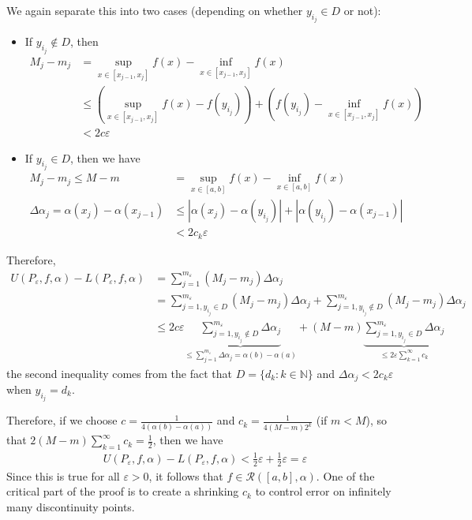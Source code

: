 \documentclass{tufte-handout}
\begin{document}
We again separate this into two cases (depending on whether \( y_{i_j} \in D \) or not):
\begin{itemize}
    \item If \( y_{i_j} \not\in D\), then 
    \begin{align}
    M_j - m_j &= \sup_{x \in [x_{j-1}, x_j]}f(x) - \inf_{x \in [x_{j-1}, x_j]}f(x)\\
    &\leq \left(
    \sup_{x \in [x_{j-1}, x_j]}f(x) - f(y_{i_j})\right) + \left(f(y_{i_j}) - \inf_{x \in [x_{j-1}, x_j]}f(x)\right)\\
    &< 2c\varepsilon
    \end{align}
    \item If \( y_{i_j} \in D \), then we have
    \begin{align}
    M_j - m_j \leq M-m &= \sup_{x \in [a,b]}f(x) - \inf_{x \in [a,b]}f(x) 
    \\
    \Delta \alpha_j = \alpha(x_j) - \alpha(x_{j-1}) &\leq |\alpha(x_j) - \alpha(y_{i_j})| + |\alpha(y_{i_j}) - \alpha(x_{j-1})|\\
     &< 2c_k\varepsilon
    \end{align}
\end{itemize}
Therefore, \begin{align}
    U(P_\varepsilon, f, \alpha) - L(P_\varepsilon, f, \alpha)
    &= \sum_{j=1}^{m_\varepsilon}(M_j - m_j)\Delta \alpha_j\\
    &= \sum_{j=1, y_{i_j} \in D}^{m_\varepsilon}(M_j - m_j)\Delta \alpha_j + \sum_{j=1, y_{i_j} \not\in D}^{m_\varepsilon}(M_j - m_j)\Delta \alpha_j\\
    &\leq 2c\varepsilon \underbrace{\sum_{j=1, y_{i_j} \not\in D}^{m_\varepsilon}\Delta \alpha_j}_{\leq \sum_{j=1}^{m_\varepsilon}\Delta \alpha_j = \alpha(b) - \alpha(a)} + 
    (M-m) \underbrace{ \sum_{j=1, y_{i_j} \in D}^{m_\varepsilon}\Delta \alpha_j }_{\leq 2\varepsilon\sum_{k=1}^{\infty}c_k}
\end{align}
the second inequality comes from the fact that \( D = \{d_k : k\in \mathbb{N}\} \) and \(\Delta \alpha_j < 2c_k\varepsilon \) when \( y_{i_j} = d_k \).

Therefore, if we choose \( c = \frac{1}{4(\alpha(b) - \alpha(a))} \) and \( c_k = \frac{1}{4(M-m)2^k} \) (if \( m < M \)),
so that \( 2(M-m)\sum_{k=1}^{\infty}c_k = \frac{1}{2} \),
then we have
\begin{align}
    U(P_\varepsilon, f, \alpha) - L(P_\varepsilon, f, \alpha) < \frac{1}{2}\varepsilon + \frac{1}{2}\varepsilon = \varepsilon
\end{align}
Since this is true for all \( \varepsilon > 0 \), it follows that \( f \in \mathcal{R}([a,b], \alpha) \).
\hfill\qedsymbol
One of the critical part of the proof is to create a shrinking \(c_k\) to control error on infinitely many 
discontinuity points.
\end{document}
